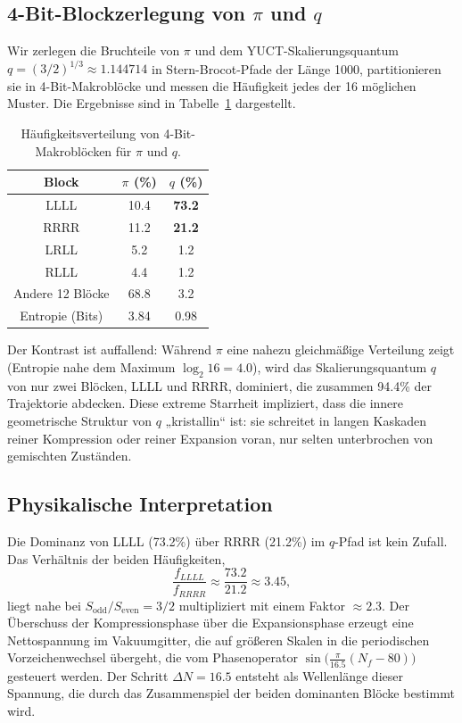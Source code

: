 \documentclass[11pt,a4paper]{article}
\begin{document}
	\subsection{4-Bit-Blockzerlegung von \(\pi\) und \(q\)}
	
	Wir zerlegen die Bruchteile von \(\pi\) und dem YUCT-Skalierungsquantum \(q = (3/2)^{1/3} \approx 1.144714\) in Stern-Brocot-Pfade der Länge 1000, partitionieren sie in 4-Bit-Makroblöcke und messen die Häufigkeit jedes der 16 möglichen Muster. Die Ergebnisse sind in Tabelle~\ref{tab:block-spectra} dargestellt.
	
	\begin{table}[htbp]
		\centering
		\caption{Häufigkeitsverteilung von 4-Bit-Makroblöcken für \(\pi\) und \(q\).}
		\label{tab:block-spectra}
		\begin{tabular}{c c c}
			\toprule
			Block & \(\pi\) (\%) & \(q\) (\%) \\
			\midrule
			LLLL & 10.4 & \textbf{73.2} \\
			RRRR & 11.2 & \textbf{21.2} \\
			LRLL & 5.2 & 1.2 \\
			RLLL & 4.4 & 1.2 \\
			Andere 12 Blöcke & 68.8 & 3.2 \\
			\midrule
			Entropie (Bits) & 3.84 & 0.98 \\
			\bottomrule
		\end{tabular}
	\end{table}
	
	Der Kontrast ist auffallend: Während \(\pi\) eine nahezu gleichmäßige Verteilung zeigt (Entropie nahe dem Maximum \(\log_2 16 = 4.0\)), wird das Skalierungsquantum \(q\) von nur zwei Blöcken, LLLL und RRRR, dominiert, die zusammen 94.4\% der Trajektorie abdecken. Diese extreme Starrheit impliziert, dass die innere geometrische Struktur von \(q\) „kristallin“ ist: sie schreitet in langen Kaskaden reiner Kompression oder reiner Expansion voran, nur selten unterbrochen von gemischten Zuständen.
	
	\subsection{Physikalische Interpretation}
	
	Die Dominanz von LLLL (73.2\%) über RRRR (21.2\%) im \(q\)-Pfad ist kein Zufall. Das Verhältnis der beiden Häufigkeiten,
	\[
	\frac{f_{LLLL}}{f_{RRRR}} \approx \frac{73.2}{21.2} \approx 3.45,
	\]
	liegt nahe bei \(S_{\mathrm{odd}}/S_{\mathrm{even}} = 3/2\) multipliziert mit einem Faktor \(\approx 2.3\). Der Überschuss der Kompressionsphase über die Expansionsphase erzeugt eine Nettospannung im Vakuumgitter, die auf größeren Skalen in die periodischen Vorzeichenwechsel übergeht, die vom Phasenoperator \(\sin\!\bigl(\frac{\pi}{16.5}(N_f-80)\bigr)\) gesteuert werden. Der Schritt \(\Delta N = 16.5\) entsteht als Wellenlänge dieser Spannung, die durch das Zusammenspiel der beiden dominanten Blöcke bestimmt wird.
	
\end{document}
